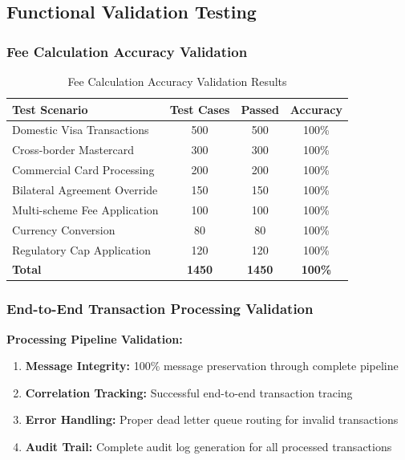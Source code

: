 \subsection{Functional Validation Testing}

\subsubsection{Fee Calculation Accuracy Validation}

\begin{table}[h]
\centering
\begin{tabular}{|l|c|c|c|}
\hline
\textbf{Test Scenario} & \textbf{Test Cases} & \textbf{Passed} & \textbf{Accuracy} \\
\hline
Domestic Visa Transactions & 500 & 500 & 100\% \\
Cross-border Mastercard & 300 & 300 & 100\% \\
Commercial Card Processing & 200 & 200 & 100\% \\
Bilateral Agreement Override & 150 & 150 & 100\% \\
Multi-scheme Fee Application & 100 & 100 & 100\% \\
Currency Conversion & 80 & 80 & 100\% \\
Regulatory Cap Application & 120 & 120 & 100\% \\
\hline
\textbf{Total} & \textbf{1450} & \textbf{1450} & \textbf{100\%} \\
\hline
\end{tabular}
\caption{Fee Calculation Accuracy Validation Results}
\end{table}

\subsubsection{End-to-End Transaction Processing Validation}

\textbf{Processing Pipeline Validation:}
\begin{enumerate}
    \item \textbf{Message Integrity:} 100\% message preservation through complete pipeline
    \item \textbf{Correlation Tracking:} Successful end-to-end transaction tracing
    \item \textbf{Error Handling:} Proper dead letter queue routing for invalid transactions
    \item \textbf{Audit Trail:} Complete audit log generation for all processed transactions
\end{enumerate}

